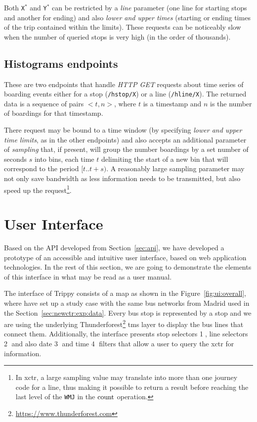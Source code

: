     Both \texttt{X$^*$} and \texttt{Y$^*$} can be restricted by a \textit{line} parameter (one line for starting stops and another for ending) and also \textit{lower and upper times} (starting or ending times of the trip contained within the limits). These requests can be noticeably slow when the number of queried stops is very high (in the order of thousands).
    
    \subsection{Histograms endpoints}
    These are two endpoints that handle {\em HTTP GET} requests about time series of boarding events either for a stop (\texttt{/hstop/X}) or a line (\texttt{/hline/X}). The returned data is a sequence of pairs $<t,n>$, where $t$ is a timestamp and $n$ is the number of boardings for that timestamp.
    
    There request may be bound to a time window (by specifying \textit{lower and upper time limits}, as in the other endpoints) and also accepts an additional parameter of \textit{sampling} that, if present, will group the number boardings by a set number of seconds $s$ into bins, each time $t$ delimiting the start of a new bin that will correspond to the period $[t..t+s)$. A reasonably large sampling parameter may not only save bandwidth as less information needs to be transmitted, but also speed up the request\footnote{In \gls{xctr}, a large sampling value may translate into more than one journey code for a line, thus making it possible to return a result before reaching the last level of the \texttt{WMJ} in the $\operatorname{count}$ operation.}.
	
	\section{User Interface}
	\label{sec:ui}
	Based on the API developed from Section~\ref{sec:api}, we have developed a prototype of an accessible and intuitive user interface, based on web application technologies. In the rest of this section, we are going to demonstrate the elements of this interface in what may be read as a user manual.
	
    The interface of Trippy consists of a map as shown in the Figure~\ref{fig:ui:overall}, where have set up a study case with the same bus networks from Madrid used in the Section~\ref{sec:newctr:exp:data}. Every bus stop is represented by a stop and we are using the underlying Thunderforest\footnote{\url{https://www.thunderforest.com}} \gls{tms} layer to display the bus lines that connect them. Additionally, the interface presents stop selectors \textcircled{1}, line selectors \textcircled{2} and also date \textcircled{3} and time \textcircled{4} filters that allow a user to query the \gls{xctr} for information.
    
